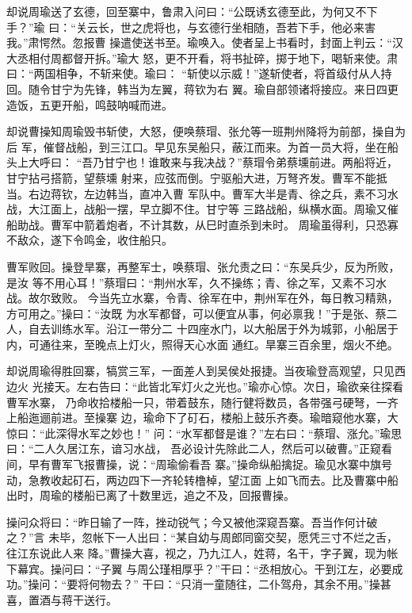 却说周瑜送了玄德，回至寨中，鲁肃入问曰：“公既诱玄德至此，为何又不下手？”瑜
曰：“关云长，世之虎将也，与玄德行坐相随，吾若下手，他必来害我。”肃愕然。忽报曹
操遣使送书至。瑜唤入。使者呈上书看时，封面上判云：“汉大丞相付周都督开拆。”瑜大
怒，更不开看，将书扯碎，掷于地下，喝斩来使。肃曰：“两国相争，不斩来使。瑜曰：
“斩使以示威！”遂斩使者，将首级付从人持回。随令甘宁为先锋，韩当为左翼，蒋钦为右
翼。瑜自部领诸将接应。来日四更造饭，五更开船，鸣鼓呐喊而进。

却说曹操知周瑜毁书斩使，大怒，便唤蔡瑁、张允等一班荆州降将为前部，操自为后
军，催督战船，到三江口。早见东吴船只，蔽江而来。为首一员大将，坐在船头上大呼曰：
“吾乃甘宁也！谁敢来与我决战？”蔡瑁令弟蔡壎前进。两船将近，甘宁拈弓搭箭，望蔡壎
射来，应弦而倒。宁驱船大进，万弩齐发。曹军不能抵当。右边蒋钦，左边韩当，直冲入曹
军队中。曹军大半是青、徐之兵，素不习水战，大江面上，战船一摆，早立脚不住。甘宁等
三路战船，纵横水面。周瑜又催船助战。曹军中箭着炮者，不计其数，从巳时直杀到未时。
周瑜虽得利，只恐寡不敌众，遂下令鸣金，收住船只。

曹军败回。操登旱寨，再整军士，唤蔡瑁、张允责之曰：“东吴兵少，反为所败，是汝
等不用心耳！”蔡瑁曰：“荆州水军，久不操练；青、徐之军，又素不习水战。故尔致败。
今当先立水寨，令青、徐军在中，荆州军在外，每日教习精熟，方可用之。”操曰：“汝既
为水军都督，可以便宜从事，何必禀我！”于是张、蔡二人，自去训练水军。沿江一带分二
十四座水门，以大船居于外为城郭，小船居于内，可通往来，至晚点上灯火，照得天心水面
通红。旱寨三百余里，烟火不绝。

却说周瑜得胜回寨，犒赏三军，一面差人到吴侯处报捷。当夜瑜登高观望，只见西边火
光接天。左右告曰：“此皆北军灯火之光也。”瑜亦心惊。次日，瑜欲亲往探看曹军水寨，
乃命收拾楼船一只，带着鼓东，随行健将数员，各带强弓硬弩，一齐上船迤逦前进。至操寨
边，瑜命下了矴石，楼船上鼓乐齐奏。瑜暗窥他水寨，大惊曰：“此深得水军之妙也！”
问：“水军都督是谁？”左右曰：“蔡瑁、涨允。”瑜思曰：“二人久居江东，谙习水战，
吾必设计先除此二人，然后可以破曹。”正窥看间，早有曹军飞报曹操，说：“周瑜偷看吾
寨。”操命纵船擒捉。瑜见水寨中旗号动，急教收起矴石，两边四下一齐轮转橹棹，望江面
上如飞而去。比及曹寨中船出时，周瑜的楼船已离了十数里远，追之不及，回报曹操。

操问众将曰：“昨日输了一阵，挫动锐气；今又被他深窥吾寨。吾当作何计破之？”言
未毕，忽帐下一人出曰：“某自幼与周郎同窗交契，愿凭三寸不烂之舌，往江东说此人来
降。”曹操大喜，视之，乃九江人，姓蒋，名干，字子翼，现为帐下幕宾。操问曰：“子翼
与周公瑾相厚乎？”干曰：“丞相放心。干到江左，必要成功。”操问：“要将何物去？”
干曰：“只消一童随往，二仆驾舟，其余不用。”操甚喜，置酒与蒋干送行。

